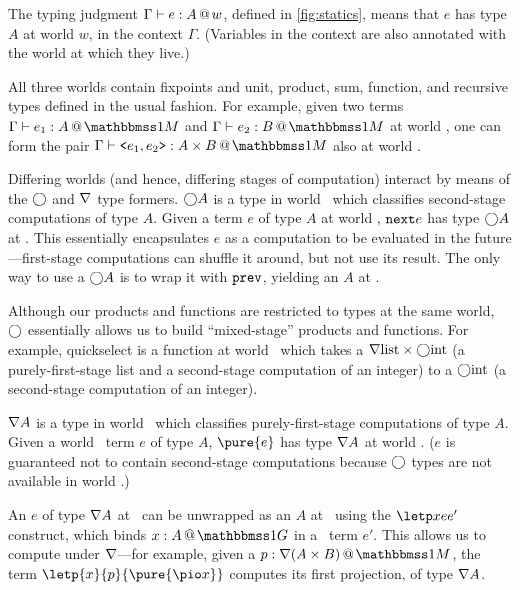 \begin{abstrsyn}

The typing judgment $\Gamma{} \vdash {e}:{A}~\hspace{-0.15em}\text{@}\hspace{-0.2em}~w$, defined in \ref{fig:statics}, means that
$e$ has type $A$ at world $w$, in the context $\Gamma$. (Variables in the
context are also annotated with the world at which they live.)

All three worlds contain fixpoints and unit, product, sum, function, and
recursive types defined in the usual fashion. For example, given two terms
$\typesone{e_1}A$ and $\typesone{e_2}B$ at world \bbonem, one can form the pair
$\typesone{\texttt{<}e_1,e_2\texttt{>}}{A\times B}$ also at world \bbonem. 

Differing worlds (and hence, differing stages of computation) interact by means
of the $\bigcirc$ and $\nabla$ type formers. $\bigcirc A$ is a type in world \bbonem\
which classifies second-stage computations of type $A$. Given a term $e$ of type
$A$ at world \bbtwo, ${\tt next}{e}$ has type $\bigcirc A$ at \bbonem. This essentially
encapsulates $e$ as a computation to be evaluated in the future---first-stage
computations can shuffle it around, but not use its result.  The only way to use
a $\bigcirc A$ is to wrap it with ${\tt prev}$, yielding an $A$ at \bbtwo.


Although our products and functions are restricted to types at the same world,
$\bigcirc$ essentially allows us to build ``mixed-stage'' products and functions.
For example, quickselect is a function at world \bbonem\ which takes a
$\nabla{\rm list} \times \bigcirc{\rm int}$ (a purely-first-stage list and a
second-stage computation of an integer) to a $\bigcirc{\rm int}$ (a second-stage
computation of an integer).

$\nabla A$ is a type in world \bbonem\ which classifies purely-first-stage
computations of type $A$. Given a world \bbonep\ term $e$ of type $A$,
$\pure{e}$ has type $\nabla A$ at world \bbonem. ($e$ is guaranteed not to contain
second-stage computations because $\bigcirc$ types are not available in world
\bbonep.)

An $e$ of type $\nabla A$ at \bbonem\ can be unwrapped as an $A$ at \bbonep\
using the $\letp xe{e'}$ construct, which binds $\colpure xA$ in a \bbonem\ term
$e'$. This allows us to compute under $\nabla$---for example, given a $\colmix
p{\curr(A\times B)}$, the term $\letp{x}{p}{\pure{\pio x}}$ computes its first
projection, of type $\nabla A$.


\end{abstrsyn}
